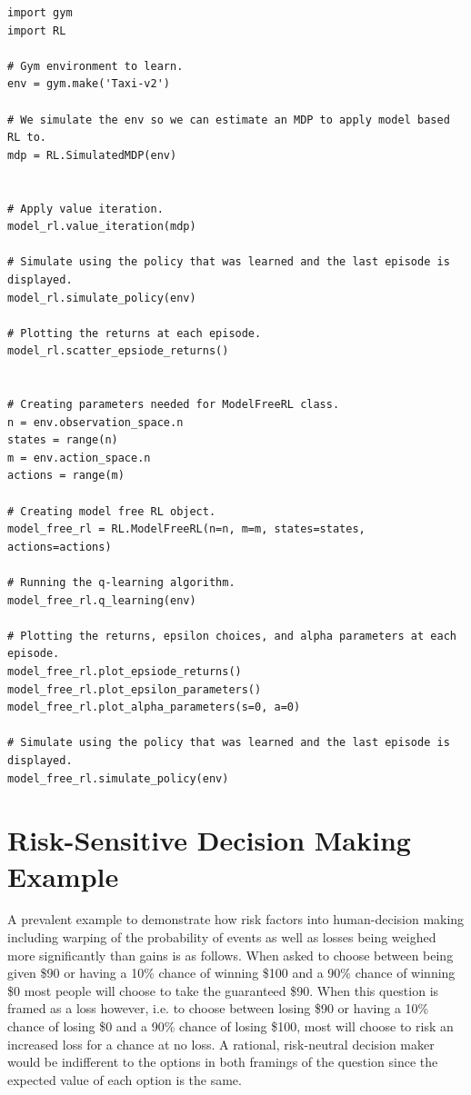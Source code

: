 \documentclass{article}
\begin{document}
\begin{lstlisting}
import gym
import RL

# Gym environment to learn.
env = gym.make('Taxi-v2')

# We simulate the env so we can estimate an MDP to apply model based RL to.
mdp = RL.SimulatedMDP(env)


# Apply value iteration.
model_rl.value_iteration(mdp)

# Simulate using the policy that was learned and the last episode is displayed.
model_rl.simulate_policy(env)

# Plotting the returns at each episode.
model_rl.scatter_epsiode_returns()


# Creating parameters needed for ModelFreeRL class.
n = env.observation_space.n
states = range(n)
m = env.action_space.n
actions = range(m)

# Creating model free RL object.
model_free_rl = RL.ModelFreeRL(n=n, m=m, states=states, actions=actions)

# Running the q-learning algorithm.
model_free_rl.q_learning(env)

# Plotting the returns, epsilon choices, and alpha parameters at each episode.
model_free_rl.plot_epsiode_returns()
model_free_rl.plot_epsilon_parameters()
model_free_rl.plot_alpha_parameters(s=0, a=0)

# Simulate using the policy that was learned and the last episode is displayed.
model_free_rl.simulate_policy(env)
\end{lstlisting}

\section{Risk-Sensitive Decision Making Example}\label{example}
A prevalent example to demonstrate how risk factors into human-decision making including warping of the probability of events as well as losses being weighed more significantly than gains is as follows. When asked to choose between being given \$90 or having a 10\% chance of winning \$100 and a 90\% chance of winning \$0 most people will choose to take the guaranteed \$90. When this question is framed as a loss however, i.e. to choose between losing \$90 or having a 10\% chance of losing \$0 and a 90\% chance of losing \$100, most will choose to risk an increased loss for a chance at no loss. A rational, risk-neutral decision maker would be indifferent to the options in both framings of the question since the expected value of each option is the same.
\end{document}
